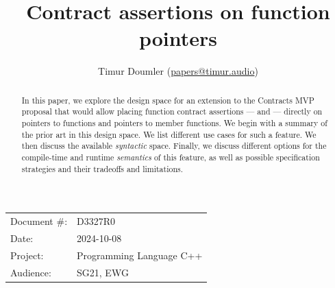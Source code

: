 

 \usepackage[bottom]{footmisc} 

 \usepackage{longtable}


\usepackage{tikz,lipsum,lmodern}
\usepackage[most]{tcolorbox}



\usepackage{titlesec}
\usepackage{tocloft}


\newcommand{\changelocaltocdepth}[1]{%
  \addtocontents{toc}{\protect\setcounter{tocdepth}{#1}}%
  \setcounter{tocdepth}{#1}%
}

\setcounter{tocdepth}{3}



\title{Contract assertions on function pointers}
\author{ Timur Doumler \small(\href{mailto:papers@timur.audio}{papers@timur.audio}) 
}
\date{}
\maketitle

\begin{tabular}{ll}
Document \#: & D3327R0 \\
Date: &2024-10-08 \\
Project: & Programming Language C++ \\
Audience: & SG21, EWG
\end{tabular}

\begin{abstract}
In this paper, we explore the design space for an extension to the Contracts MVP proposal \cite{P2900R8} that would allow placing function contract assertions ---  and  --- directly on pointers to functions and pointers to member functions. We begin  with a summary of the prior art in this design space. We list different use cases for such a feature. We then discuss the available \emph{syntactic} space. Finally, we discuss different  options for the compile-time and runtime \emph{semantics} of this feature, as well as possible specification strategies and their tradeoffs and limitations.
\end{abstract}

